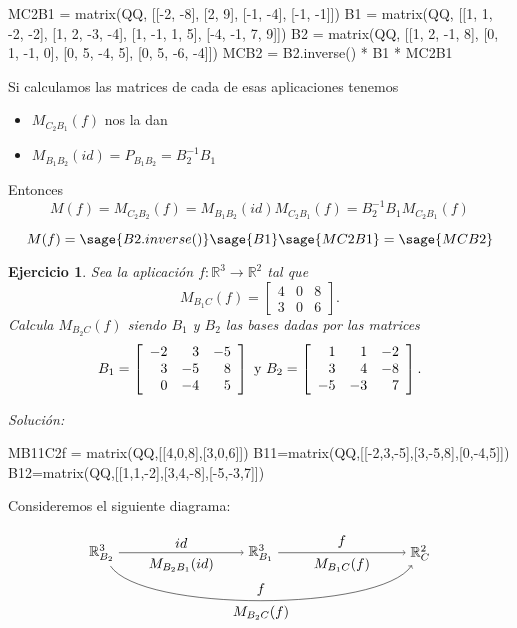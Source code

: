 \documentclass{amsart}
\newtheorem{ejer}{Ejercicio}
\def\r{\mathbb{R}}
\begin{document}
\begin{sageblock}
MC2B1 = matrix(QQ, [[-2, -8], [2, 9], [-1, -4], [-1, -1]])
B1 = matrix(QQ, [[1, 1, -2, -2], [1, 2, -3, -4], [1, -1, 1, 5], [-4, -1, 7, 9]])
B2 = matrix(QQ, [[1, 2, -1, 8], [0, 1, -1, 0], [0, 5, -4, 5], [0, 5, -6, -4]])
MCB2 =  B2.inverse() * B1 * MC2B1
\end{sageblock}

Si calculamos las matrices de cada de esas aplicaciones tenemos
\begin{itemize}
	\item $M_{C_2B_1}(f)$ nos la dan
	\item $M_{B_1B_2}(id) = P_{B_1B_2} = B_2^{-1} B_1$
\end{itemize}
Entonces
$$
	M(f) = M_{C_2B_2}(f) = M_{B_1B_2}(id) M_{C_2B_1}(f) = B_2^{-1} B_1  M_{C_2B_1}(f)
$$

$$
	M(f) = \sage{B2.inverse()} \sage{B1} \sage{MC2B1} = \sage{MCB2}
$$


\begin{ejer} 
Sea la aplicación $f: \r ^3\to \r ^2$ tal que 
\[ M_{B_1C}(f) = \left[ \begin{array}{rrr} 4 & 0 & 8 \\  
3 & 0 & 6 \end{array} \right]. \] Calcula $M_{B_2C}(f)$ 
siendo $B_1$ y $B_2$ las bases dadas por las matrices 
\[ B_1 = \left[ \begin{array}{rrr} -2 & 3 & -5\\ 3 & -5 & 8\\ 0 & -4 & 5 
\end{array} \right] \ \hbox{y} \ B_2 = \left[ \begin{array}{rrr} 1 & 1 & -2\\ 
3 & 4 & -8\\ -5 & -3 & 7  \end{array} \right].  \]
\end{ejer}

{\it Soluci\'on:}

\begin{sageblock}
MB11C2f = matrix(QQ,[[4,0,8],[3,0,6]])
B11=matrix(QQ,[[-2,3,-5],[3,-5,8],[0,-4,5]])
B12=matrix(QQ,[[1,1,-2],[3,4,-8],[-5,-3,7]])
\end{sageblock}

Consideremos el siguiente diagrama:

$$
\begin{tikzpicture}[xscale = 2]
\node (RB2) at (0,0) {$\r^3_{B_2}$};
\node (RB1) at (2,0) {$\r^3_{B_1}$};
\node (RC)  at (4,0) {$\r^2_{C}$};
\draw[->] (RB2) to node [above] {$id$} 
                   node [below] {$M_{B_2B_1}(id)$} (RB1);
\draw[->] (RB1) to node [above] {$f$} 
                   node [below] {$M_{B_1C}(f)$} (RC); 
\draw[->] (RB2) .. controls (0.5,-1.5) and (3.5,-1.5) .. 
                node [above] {$f$}
                node [below] {$M_{B_2C}(f)$} (RC);
\end{tikzpicture}
$$
\end{document}
